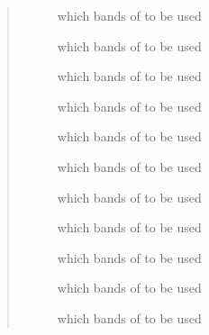 \documentclass[letterpaper,10pt,english]{sphinxmanual}
\begin{document}
\begin{fulllineitems}
\begin{fulllineitems}
\begin{quote}
\begin{description}
\begin{description}
\item[{}] \leavevmode{[}\sphinxtitleref{list}{]}
which bands of  to be used

\item[{}] \leavevmode{[}\sphinxtitleref{list}{]}
which bands of  to be used

\item[{}] \leavevmode{[}\sphinxtitleref{list}{]}
which bands of  to be used

\item[{}] \leavevmode{[}\sphinxtitleref{list}{]}
which bands of  to be used

\item[{}] \leavevmode{[}\sphinxtitleref{list}{]}
which bands of  to be used

\item[{}] \leavevmode{[}\sphinxtitleref{list}{]}
which bands of  to be used

\item[{}] \leavevmode{[}\sphinxtitleref{list}{]}
which bands of  to be used

\item[{}] \leavevmode{[}\sphinxtitleref{list}{]}
which bands of  to be used

\item[{}] \leavevmode{[}\sphinxtitleref{list}{]}
which bands of  to be used

\item[{}] \leavevmode{[}\sphinxtitleref{list}{]}
which bands of  to be used

\item[{}] \leavevmode{[}\sphinxtitleref{list}{]}
which bands of  to be used

\end{description}

\end{description}\end{quote}


\end{fulllineitems}
\end{fulllineitems}
\end{document}
